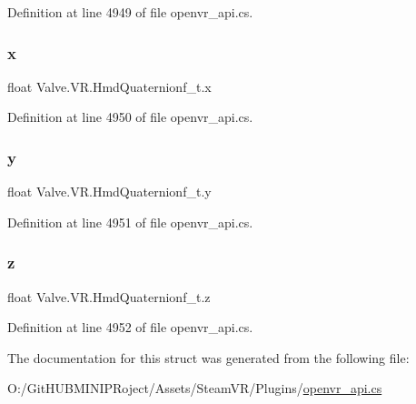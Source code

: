 Definition at line 4949 of file openvr\+\_\+api.\+cs.

\mbox{\label{struct_valve_1_1_v_r_1_1_hmd_quaternionf__t_adfd11b6c1f41fa63e5f8b54f34287d65}} 
\subsubsection{\texorpdfstring{x}{x}}
{\footnotesize\ttfamily float Valve.\+V\+R.\+Hmd\+Quaternionf\+\_\+t.\+x}



Definition at line 4950 of file openvr\+\_\+api.\+cs.

\mbox{\label{struct_valve_1_1_v_r_1_1_hmd_quaternionf__t_a64e4ca31abf28fb7cc30dcba37e2c7d9}} 
\subsubsection{\texorpdfstring{y}{y}}
{\footnotesize\ttfamily float Valve.\+V\+R.\+Hmd\+Quaternionf\+\_\+t.\+y}



Definition at line 4951 of file openvr\+\_\+api.\+cs.

\mbox{\label{struct_valve_1_1_v_r_1_1_hmd_quaternionf__t_ae3071f122985db1cb2d8cf67bc38763a}} 
\subsubsection{\texorpdfstring{z}{z}}
{\footnotesize\ttfamily float Valve.\+V\+R.\+Hmd\+Quaternionf\+\_\+t.\+z}



Definition at line 4952 of file openvr\+\_\+api.\+cs.



The documentation for this struct was generated from the following file\+:\begin{DoxyCompactItemize}
\item 
O\+:/\+Git\+H\+U\+B\+M\+I\+N\+I\+P\+Roject/\+Assets/\+Steam\+V\+R/\+Plugins/\mbox{\hyperlink{openvr__api_8cs}{openvr\+\_\+api.\+cs}}\end{DoxyCompactItemize}
